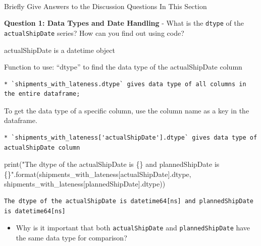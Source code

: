 \documentclass[
]{article}
\makeatletter
\let\oldparagraph\paragraph
\renewcommand{\paragraph}{
    \@ifstar
      \xxxParagraphStar
      \xxxParagraphNoStar
  }
\newcommand{\xxxParagraphStar}[1]{\oldparagraph*{#1}\mbox{}}
\newcommand{\xxxParagraphNoStar}[1]{\oldparagraph{#1}\mbox{}}
\newenvironment{Shaded}{\begin{snugshade}}{\end{snugshade}}
\newcommand{\BuiltInTok}[1]{\textcolor[rgb]{0.00,0.23,0.31}{#1}}
\newcommand{\NormalTok}[1]{\textcolor[rgb]{0.00,0.23,0.31}{#1}}
\newcommand{\SpecialCharTok}[1]{\textcolor[rgb]{0.37,0.37,0.37}{#1}}
\newcommand{\StringTok}[1]{\textcolor[rgb]{0.13,0.47,0.30}{#1}}
\providecommand{\tightlist}{%
  \setlength{\itemsep}{0pt}\setlength{\parskip}{0pt}}
\makeatother
\begin{document}
\paragraph{Briefly Give Answers to the Discussion Questions In This
Section}\label{briefly-give-answers-to-the-discussion-questions-in-this-section}

\textbf{Question 1: Data Types and Date Handling} - What is the
\texttt{dtype} of the \texttt{actualShipDate} series? How can you find
out using code?

actualShipDate is a datetime object

Function to use: ``dtype'' to find the data type of the actualShipDate
column

\begin{verbatim}
* `shipments_with_lateness.dtype` gives data type of all columns in the entire dataframe; 
\end{verbatim}

To get the data type of a specific column, use the column name as a key
in the dataframe.

\begin{verbatim}
* `shipments_with_lateness['actualShipDate'].dtype` gives data type of actualShipDate column
\end{verbatim}

\label{dtype-example}
\begin{Shaded}
\begin{Highlighting}[]
\BuiltInTok{print}\NormalTok{(}\StringTok{"The dtype of the actualShipDate is }\SpecialCharTok{\{\}}\StringTok{ and plannedShipDate is }\SpecialCharTok{\{\}}\StringTok{"}\NormalTok{.}\BuiltInTok{format}\NormalTok{(shipments\_with\_lateness[}\StringTok{\textquotesingle{}actualShipDate\textquotesingle{}}\NormalTok{].dtype, shipments\_with\_lateness[}\StringTok{\textquotesingle{}plannedShipDate\textquotesingle{}}\NormalTok{].dtype))}
\end{Highlighting}
\end{Shaded}

\begin{verbatim}
The dtype of the actualShipDate is datetime64[ns] and plannedShipDate is datetime64[ns]
\end{verbatim}

\begin{itemize}
\tightlist
\item
  Why is it important that both \texttt{actualShipDate} and
  \texttt{plannedShipDate} have the same data type for comparison?
\end{itemize}
\end{document}
